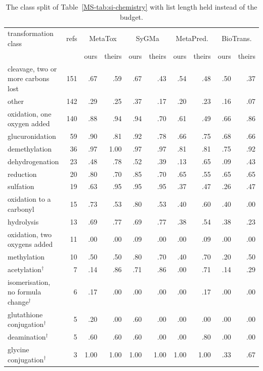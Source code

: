 \begin{table}[h]
\centering\scriptsize
\begin{threeparttable}
\caption{The class split of Table~\ref{MS-tab:si-chemistry} with list length held instead of the budget.}
\label{tab:si-chemistry-matched}
\begin{tabular}{@{}lrrrrrrrrr@{}}
\toprule
transformation class & refs & \multicolumn{2}{c}{MetaTox} & \multicolumn{2}{c}{SyGMa} & \multicolumn{2}{c}{MetaPred.} & \multicolumn{2}{c}{BioTrans.} \\
 & & ours & theirs & ours & theirs & ours & theirs & ours & theirs \\
\midrule
cleavage, two or more carbons lost & 151 & .67 & .59 & .67 & .43 & .54 & .48 & .50 & .37 \\
other & 142 & .29 & .25 & .37 & .17 & .20 & .23 & .16 & .07 \\
oxidation, one oxygen added & 140 & .88 & .94 & .94 & .70 & .61 & .49 & .66 & .86 \\
glucuronidation & 59 & .90 & .81 & .92 & .78 & .66 & .75 & .68 & .66 \\
demethylation & 36 & .97 & 1.00 & .97 & .97 & .81 & .81 & .75 & .92 \\
dehydrogenation & 23 & .48 & .78 & .52 & .39 & .13 & .65 & .09 & .43 \\
reduction & 20 & .80 & .70 & .85 & .70 & .65 & .55 & .65 & .65 \\
sulfation & 19 & .63 & .95 & .95 & .95 & .37 & .47 & .26 & .47 \\
oxidation to a carbonyl & 15 & .73 & .53 & .80 & .53 & .40 & .60 & .40 & .00 \\
hydrolysis & 13 & .69 & .77 & .69 & .77 & .38 & .54 & .38 & .23 \\
oxidation, two oxygens added & 11 & .00 & .00 & .09 & .00 & .00 & .09 & .00 & .00 \\
methylation & 10 & .50 & .50 & .80 & .70 & .40 & .70 & .20 & .50 \\
acetylation$^{\dagger}$ & 7 & .14 & .86 & .71 & .86 & .00 & .71 & .14 & .29 \\
isomerisation, no formula change$^{\dagger}$ & 6 & .17 & .00 & .00 & .00 & .00 & .17 & .00 & .00 \\
glutathione conjugation$^{\dagger}$ & 5 & .20 & .00 & .60 & .00 & .00 & .00 & .00 & .00 \\
deamination$^{\dagger}$ & 5 & .60 & .60 & .60 & .00 & .00 & .80 & .00 & .00 \\
glycine conjugation$^{\dagger}$ & 3 & 1.00 & 1.00 & 1.00 & 1.00 & 1.00 & 1.00 & .33 & .67 \\

\end{tabular}
\end{threeparttable}
\end{table}
